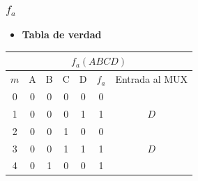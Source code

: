 \subsubsection{$f_a$}
\begin{itemize}[nosep]\item\textbf{Tabla de verdad}\end{itemize}
\begin{center}
\begin{tabular}{ccccccc}
\multicolumn{7}{c}{\cellcolor[HTML]{FFFFC7}$f_a(ABCD)$}                                                                                                                                                                                                                       \\ \hline
\multicolumn{1}{c|}{\cellcolor[HTML]{9AFF99}$m$} & \cellcolor[HTML]{ECF4FF}A & \cellcolor[HTML]{ECF4FF}B & \cellcolor[HTML]{ECF4FF}C & \multicolumn{1}{c|}{\cellcolor[HTML]{ECF4FF}D} & \multicolumn{1}{c|}{\cellcolor[HTML]{FFCCC9}$f_a$} & Entrada al MUX                   \\ \hline
\multicolumn{1}{c|}{0}                           & 0                         & 0                         & 0                         & \multicolumn{1}{c|}{0}                         & \multicolumn{1}{c|}{0}                             &                                  \\
\multicolumn{1}{c|}{1}                           & 0                         & 0                         & 0                         & \multicolumn{1}{c|}{1}                         & \multicolumn{1}{c|}{1}                             & \multirow{-2}{*}{$D$}            \\ \hline
\multicolumn{1}{c|}{2}                           & 0                         & 0                         & 1                         & \multicolumn{1}{c|}{0}                         & \multicolumn{1}{c|}{0}                             &                                  \\
\multicolumn{1}{c|}{3}                           & 0                         & 0                         & 1                         & \multicolumn{1}{c|}{1}                         & \multicolumn{1}{c|}{1}                             & \multirow{-2}{*}{$D$}            \\ \hline
\multicolumn{1}{c|}{4}                           & 0                         & 1                         & 0                         & \multicolumn{1}{c|}{0}                         & \multicolumn{1}{c|}{1}                             &                                  \\

\end{tabular}
\end{center}

